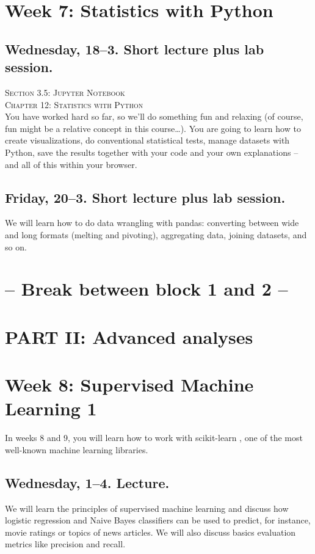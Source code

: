 \section*{Week 7: Statistics with Python}

\subsection*{Wednesday, 18--3. Short lecture plus lab session.}
\textsc{ Section 3.5: Jupyter Notebook}\\
\textsc{ Chapter 12: Statistics with Python}\\
You have worked hard so far, so we'll do something fun and relaxing (of course, fun might be a relative concept in this course\ldots). You are going to learn how to create visualizations, do conventional statistical tests, manage datasets with Python, save the results together with your code and your own explanations -- and all of this within your browser.



\subsection*{Friday, 20--3.  Short lecture plus lab session.}
We will learn how to do data wrangling with pandas: converting between wide and long formats (melting and pivoting), aggregating data, joining datasets, and so on.


\section*{-- Break between block 1 and 2 -- }

\section*{PART II: Advanced analyses}


\section*{Week 8: Supervised Machine Learning 1}
In weeks 8 and 9, you will learn how to work with scikit-learn \citep{scikit-learn}, one of the most well-known machine learning libraries.


\subsection*{Wednesday, 1--4. Lecture.}
We will learn the principles of supervised machine learning and discuss how logistic regression and Naive Bayes classifiers can be used to predict, for instance, movie ratings or topics of news articles. We will also discuss basics evaluation metrics like precision and recall.

